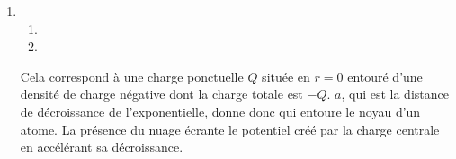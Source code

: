 \begin{corrige}
\begin{enumerate}
 	\item \begin{enumerate}
		\item {}
		\item {}
	  \end{enumerate}

	  Cela correspond à une charge ponctuelle $Q$ située en $r = 0$ entouré
	  d'une densité de charge négative dont la charge totale est $-Q$. $a$,
	  qui est la distance de décroissance de l'exponentielle, donne donc  qui entoure le noyau d'un atome.
	  La présence du nuage écrante le potentiel créé par la charge centrale
	  en accélérant sa décroissance.
\end{enumerate}
\end{corrige}



